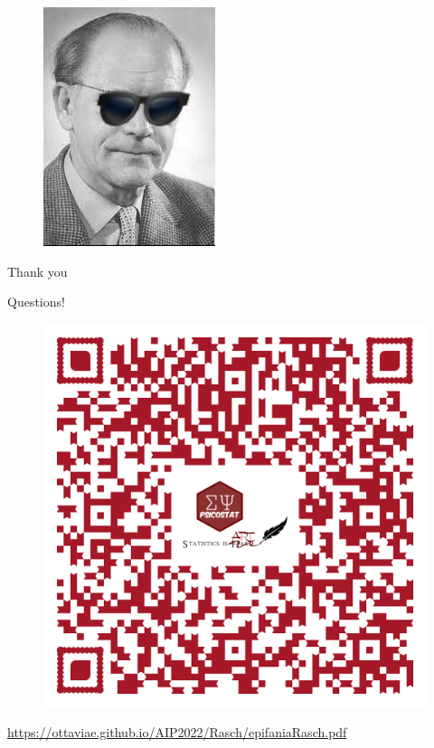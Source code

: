 \documentclass{beamer}
\begin{document}
\begin{frame}[plain]
	\begin{figure}
		\centering
		\includegraphics[width=0.5\linewidth]{raschJ}
	\end{figure}
	
	
	\begin{center}
\Huge

\textcolor{template}{Thank you}
	\end{center}
\end{frame}

\begin{frame}[plain]{Questions!}
\begin{figure}
	\centering
	\includegraphics[width=0.5\linewidth]{domande-simposio-word}
\end{figure}

\vspace{5mm}
\begin{center}
	\href{https://ottaviae.github.io/AIP2022/Rasch/epifaniaRasch.pdf}{https://ottaviae.github.io/AIP2022/Rasch/epifaniaRasch.pdf}
\end{center}

\end{frame}
\end{document}
